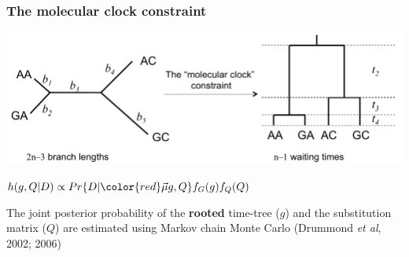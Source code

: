 \begin{frame}
\frametitle{The molecular clock constraint}

\includegraphics[width=\textwidth]{../images/ClockConstraint}

\bigskip{}

\begin{centering}

$h(g,Q|D) \propto Pr\{D|{\color{red} \vec{\mu}} g,Q\}f_{G}(g)f_{Q}(Q)$

\end{centering}

\bigskip{}

The joint posterior probability of the \textbf{rooted} time-tree ($g$) and the substitution matrix ($Q$) are estimated using Markov chain Monte Carlo (Drummond \textit{et al}, 2002; 2006)

\end{frame}
